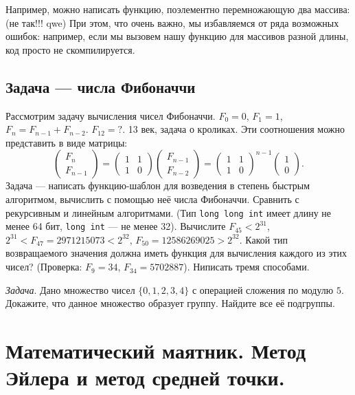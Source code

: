 \documentclass{book}
\begin{document}
Например, можно написать функцию, поэлементно перемножающую два массива:
(не так!!! qwe) При этом, что очень важно, мы избавляемся от ряда возможных ошибок: например, если мы вызовем нашу
функцию для массивов разной длины, код просто не скомпилируется.

\subsection{Задача --- числа Фибоначчи}
Рассмотрим задачу вычисления чисел Фибоначчи. $F_0 = 0$, $F_1 = 1$, $F_n = F_{n-1} + F_{n-2}$.
$F_{12} = ?$.
13 век, задача о кроликах. Эти
соотношения можно представить в виде матрицы:
\begin{equation}
    \begin{pmatrix} F_n \\ F_{n-1} \end{pmatrix} = \begin{pmatrix} 1 & 1 \\ 1 & 0 \end{pmatrix}
    \begin{pmatrix} F_{n - 1} \\ F_{n - 2} \end{pmatrix} = \begin{pmatrix} 1 & 1 \\ 1 & 0
\end{pmatrix}^{n - 1} \begin{pmatrix} 1 \\ 0 \end{pmatrix}.
\end{equation}
Задача --- написать функцию-шаблон для возведения в степень быстрым алгоритмом, вычислить с помощью
неё числа Фибоначчи. Сравнить с рекурсивным и линейным алгоритмами. (Тип
\texttt{long long int} имеет длину не менее 64 бит, \texttt{long int} --- не
менее 32). Вычислите $F_{45} < 2^{31}$, $2^{31} < F_{47} = 2971215073 < 2^{32}$, $F_{50} =
12586269025 > 2^{32}$.  Какой тип возвращаемого значения должна иметь функция для вычисления
каждого из этих чисел?  (Проверка: $F_{9} = 34$, $F_{34} = 5702887$). Ниписать тремя способами.

\clearpage
\textit{Задача}. Дано множество чисел $\{0,1,2,3,4\}$ с операцией сложения по модулю $5$. Докажите,
что данное множество образует группу. Найдите все её подгруппы.

\section{Математический маятник. Метод Эйлера и метод средней точки.}
\end{document}
